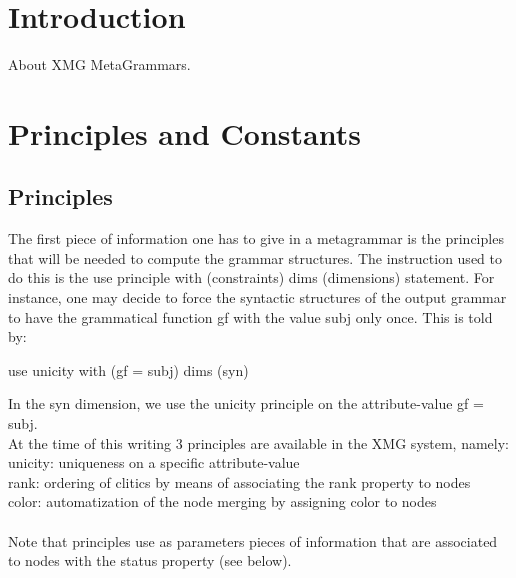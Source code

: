 \documentclass[11pt,fleqn]{book} %
\begin{document}
\pagestyle{empty} %

\tableofcontents %

\cleardoublepage %

\pagestyle{fancy} %



\chapter{Introduction}

About XMG MetaGrammars. 

\chapter{Principles and Constants}

\section{Principles}
The first piece of information one has to give in a metagrammar is the principles that will be needed to compute the grammar structures. The instruction used to do this is the use principle with (constraints) dims (dimensions) statement. For instance, one may decide to force the syntactic structures of the output grammar to have the grammatical function gf with the value subj only once. This is told by:

\begin{theorem}
use unicity with (gf = subj) dims (syn)
\end{theorem}
In the syn dimension, we use the unicity principle on the attribute-value gf = subj.\\ At the time of this writing 3 principles are available in the XMG system, namely:\\
unicity: 	uniqueness on a specific attribute-value\\
rank: 	ordering of clitics by means of associating the rank property to nodes\\
color: 	automatization of the node merging by assigning color to nodes\\
\\
Note that principles use as parameters pieces of information that are associated to nodes with the status property (see below). 
\end{document}
